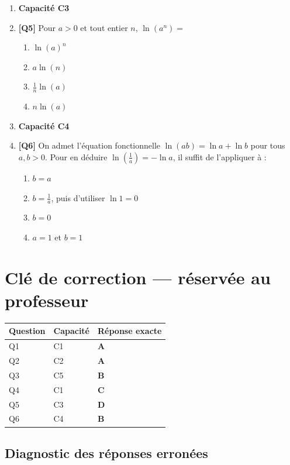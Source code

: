 \begin{enumerate}
\item[] \textbf{Capacité C3}

\item \textbf{[Q5]} Pour $a>0$ et tout entier $n$, $\ln(a^n) =$
  \begin{enumerate}[label=\Alph*.]
    \item $\ln(a)^n$
    \item $a \ln(n)$
    \item $\frac{1}{n} \ln(a)$
    \item $n \ln(a)$
  \end{enumerate}

\item[] \textbf{Capacité C4}

\item \textbf{[Q6]} On admet l'équation fonctionnelle $\ln(ab)=\ln a+\ln b$ pour tous $a,b>0$. Pour en déduire $\ln\!\left(\tfrac1a\right)=-\ln a$, il suffit de l'appliquer à :
  \begin{enumerate}[label=\Alph*.]
    \item $b=a$
    \item $b=\tfrac1a$, puis d'utiliser $\ln 1=0$
    \item $b=0$
    \item $a=1$ et $b=1$
  \end{enumerate}

\end{enumerate}

\ifnxVersionProfesseur
\clearpage
\section*{Clé de correction — réservée au professeur}

\begin{center}
\begin{tabular}{lll}
\hline
Question & Capacité & Réponse exacte \\
\hline
Q1 & C1 & \textbf{A} \\
Q2 & C2 & \textbf{A} \\
Q3 & C5 & \textbf{B} \\
Q4 & C1 & \textbf{C} \\
Q5 & C3 & \textbf{D} \\
Q6 & C4 & \textbf{B} \\
\hline
\end{tabular}
\end{center}

\subsection*{Diagnostic des réponses erronées}

